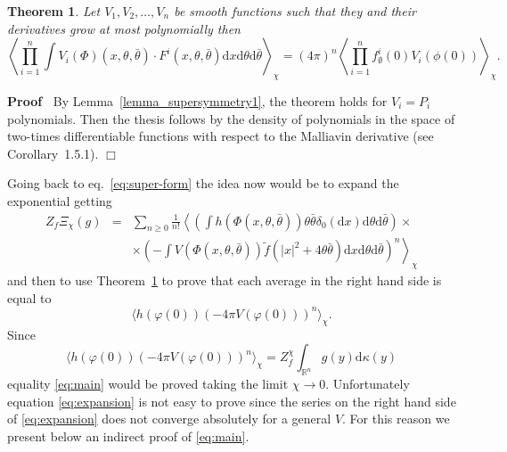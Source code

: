 \documentclass[a4paper,10pt]{article}
\newcommand{\mathd}{\mathrm{d}}
\newenvironment{proof}{\noindent\textbf{Proof\ }}{\hspace*{\fill}$\Box$\medskip}
\newtheorem{theorem}{Theorem}
\begin{document}
\begin{theorem}
  \label{theorem_supersymmetry2}Let $V_1, V_2, \ldots, V_n$ be smooth
  functions such that they and their derivatives grow at most polynomially
  then
  \[ \left\langle \prod^n_{i = 1} \int V_i (\Phi) (x, \theta, \bar{\theta})
     \cdot F^i (x, \theta, \bar{\theta}) \mathd x \mathd \theta \mathd
     \bar{\theta} \right\rangle_{\chi} = (4 \pi)^n \left\langle \prod_{i =
     1}^n f^i_{\emptyset} (0) V_i (\phi (0)) \right\rangle_{\chi} . \]
\end{theorem}

\begin{proof}
  By Lemma~\ref{lemma_supersymmetry1}, the theorem holds for $V_i = P_i$
  polynomials. Then the thesis follows by the density of polynomials in the
  space of two-times differentiable functions with respect to the Malliavin
  derivative (see {\cite{Nualart2006}} Corollary~1.5.1). 
\end{proof}

\begin{remark}
  \label{remark_expansion}Going back to eq.~{\eqref{eq:super-form}} the idea
  now would be to expand the exponential getting
  \begin{eqnarray}
    Z_f \Xi_{\chi} (g) & = & \sum_{n \geqslant 0} \frac{1}{n!} \left.
    \left\langle \left( \int h (\Phi (x, \theta, \bar{\theta})) \theta
    \bar{\theta} \delta_0 (\mathd x) \mathd \theta \mathd \bar{\theta} \right)
    \times \right. \right. \nonumber\\
    &  & \left. \times \left( - \int V (\Phi (x, \theta, \bar{\theta}))
    \tilde{f} (| x |^2 + 4 \theta \bar{\theta}) \mathd x \mathd \theta \mathd
    \bar{\theta} \right)^n \right\rangle_{\chi}  \label{eq:expansion}
  \end{eqnarray}
  and then to use Theorem~\ref{theorem_supersymmetry2} to prove that each
  average in the right hand side is equal to
  \[ \langle h (\varphi (0)) (- 4 \pi V (\varphi (0)))^n \rangle_{\chi} . \]
  Since
  \[ \langle h (\varphi (0)) (- 4 \pi V (\varphi (0)))^n \rangle_{\chi} =
     Z_f^{\chi} \int_{\mathbb{R}^n} g (y) \mathd \kappa (y) \]
  equality {\eqref{eq:main}} would be proved taking the limit $\chi
  \rightarrow 0$. Unfortunately equation {\eqref{eq:expansion}} is not easy to
  prove since the series on the right hand side of {\eqref{eq:expansion}} does
  not converge absolutely for a general $V$. For this reason we present below
  an indirect proof of {\eqref{eq:main}}.
\end{remark}
\end{document}
